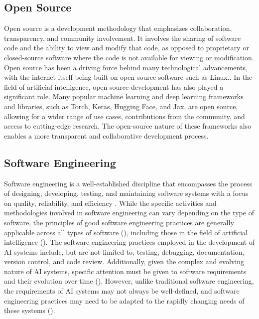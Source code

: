 \subsection{Open Source}
Open source is a development methodology that emphasizes collaboration, transparency, and community involvement. It involves the sharing of software code and the ability to view and modify that code, as opposed to proprietary or closed-source software where the code is not available for viewing or modification. Open source has been a driving force behind many technological advancements, with the internet itself being built on open source software such as Linux..
In the field of artificial intelligence, open source development has also played a significant role. Many popular machine learning and deep learning frameworks and libraries, such as Torch, Keras, Hugging Face, and Jax, are open source, allowing for a wider range of use cases, contributions from the community, and access to cutting-edge research. The open-source nature of these frameworks also enables a more transparent and collaborative development process.


\subsection{Software Engineering}
Software engineering is a well-established discipline that encompasses the process of designing, developing, testing, and maintaining software systems with a focus on quality, reliability, and efficiency \cite{pressman2010software}. While the specific activities and methodologies involved in software engineering can vary depending on the type of software, the principles of good software engineering practices are generally applicable across all types of software (\cite{pressman2010software}), including those in the field of artificial intelligence (\cite{se4dl,wan2019does,martinez2022softwareAI,davis2011understandingmodularity}). The software engineering practices employed in the development of AI systems include, but are not limited to, testing, debugging, documentation, version control, and code review. Additionally, given the complex and evolving nature of AI systems, specific attention must be given to software requirements and their evolution over time (\cite{heyn2021requirement,belani2019requirements}). However, unlike traditional software engineering, the requirements of AI systems may not always be well-defined, and software engineering practices may need to be adapted to the rapidly changing needs of these systems (\cite{heyn2021requirement,belani2019requirements}). 


